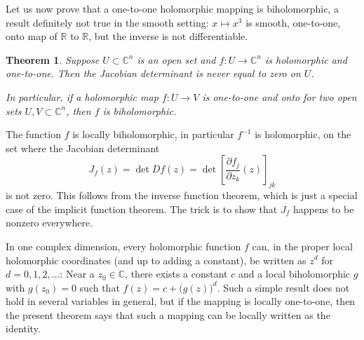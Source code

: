 \documentclass[12pt,openany]{book}
\newcommand{\C}{{\mathbb{C}}}
\newcommand{\R}{{\mathbb{R}}}
\theoremstyle{plain}
\newtheorem{thm}{Theorem}[section]
\theoremstyle{remark}
\theoremstyle{definition}
\theoremstyle{exercise}
\theoremstyle{example}
\begin{document}
Let us now prove that a one-to-one holomorphic
mapping is biholomorphic, a result definitely not true in the
smooth setting: $x \mapsto x^3$ is smooth, one-to-one, onto map
of $\R$ to $\R$, but the inverse is not differentiable.

\begin{thm} \label{thm:injective}
Suppose $U \subset \C^n$ is an open set and $f \colon U \to \C^n$ is
holomorphic and one-to-one.  Then the Jacobian determinant is never equal to zero 
on $U$.

In particular, if a holomorphic map $f \colon U \to V$ is
one-to-one and onto for two open sets $U,V \subset \C^n$, then $f$ is
biholomorphic.
\end{thm}

The function $f$ is locally biholomorphic, in particular
$f^{-1}$ is holomorphic,
on the set where the Jacobian determinant
\begin{equation*}
J_f(z) = \det Df(z) = \det \left[ \frac{\partial f_j}{\partial z_k}(z)
\right]_{jk}
\end{equation*}
is not zero.  This follows from the inverse function theorem, which is just
a special case of the implicit function theorem.
The trick is to show that $J_f$ happens to be nonzero
everywhere.

In one complex dimension, every holomorphic function $f$ can, in
the proper local holomorphic coordinates (and up to adding a constant),
be written as $z^d$ for $d=0,1,2,\ldots$:
Near a $z_0 \in \C$,
there exists a constant $c$ and a local biholomorphic $g$
with $g(z_0) = 0$ such that
$f(z) = c + {\bigl( g(z) \bigr)}^d$.
Such a simple result
does not hold in several variables in general, but if the mapping is
locally one-to-one, then the present theorem says that such a mapping can be
locally written as the identity.
\end{document}

